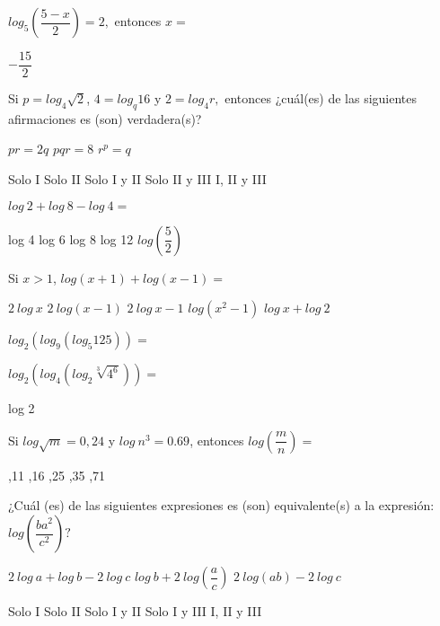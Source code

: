 \documentclass[pagina vacia]{srs}
\begin{document}
\begin{preguntas}
\pregunta $log_{5}\left(\dfrac{5-x}{2}\right)=2,$ entonces $x=$
\begin{vertical}
\alternativa $-\dfrac{15}{2}$
\end{vertical}

\pregunta Si $p=log_{4}\sqrt{2}$, $4=log_{q}16$ y $2=log_{4}r,$ entonces ¿cuál(es) de las siguientes afirmaciones es (son) verdadera(s)?
\begin{verticali}
\alternativa $pr=2q$
\alternativa $pqr=8$
\alternativa $r^{p}=q$
\end{verticali}
\begin{vertical}
\alternativa Solo I
\alternativa Solo II
\alternativa Solo I y II
\alternativa Solo II y III
\alternativa I, II y III
\end{vertical}

\pregunta $log~2+log~8-log~4=$
\begin{vertical}
\alternativa log 4
\alternativa log 6
\alternativa log 8
\alternativa log 12
\alternativa $log\left(\dfrac{5}{2}\right)$
\end{vertical}

\pregunta Si $x>1$, $log\left(x+1\right)+log\left(x-1\right)=$
\begin{vertical}
\alternativa $2~log~x$
\alternativa $2~log\left(x-1\right)$
\alternativa $2~log~x-1$
\alternativa $log\left(x^{2}-1\right)$
\alternativa $log~x+log~2$
\end{vertical}

\pregunta $log_{2}\left(log_{9}\left(log_{5}125\right)\right)=$
\begin{vertical}
\end{vertical}

\pregunta $log_{2}\left(log_{4}\left(log_{2}\sqrt[3]{4^{6}}\right)\right)=$
\begin{vertical}
\alternativa log 2
\end{vertical}

\pregunta Si $log\sqrt{m}=0,24$ y $log~n^{3}=0.69$, entonces $log\left(\dfrac{m}{n}\right)=$
\begin{vertical}
,11
,16
,25
,35
,71
\end{vertical}

\pregunta ¿Cuál (es) de las siguientes expresiones es (son) equivalente(s) a la expresión: $log\left(\dfrac{ba^{2}}{c^{2}}\right)?$
\begin{verticali}
\alternativa $2~log~a+log~b-2~log~c$
\alternativa $log~b+2~log\left(\dfrac{a}{c}\right)$
\alternativa $2~log\left(ab\right)-2~log~c$
\end{verticali}
\begin{vertical}
\alternativa Solo I
\alternativa Solo II
\alternativa Solo I y II
\alternativa Solo I y III
\alternativa I, II y III
\end{vertical}


\end{preguntas}
\end{document}
